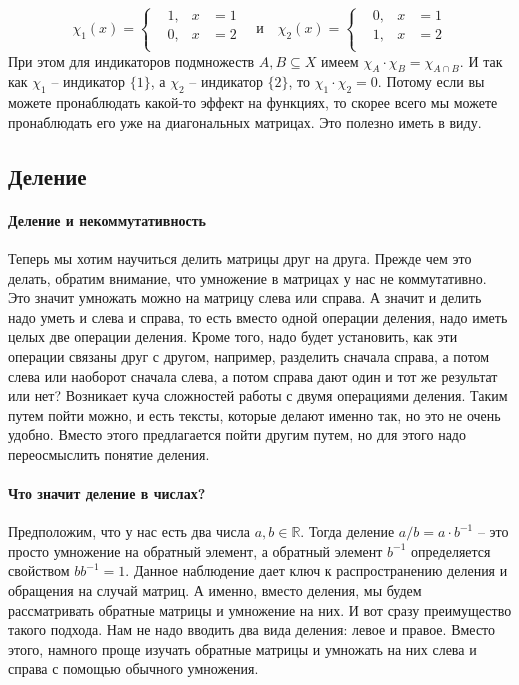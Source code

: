 \[
\chi_{1} (x) =
\left\{
\begin{aligned}
&1,& x &= 1\\
&0,& x &= 2\\
\end{aligned}
\right.
\quad\text{и}\quad
\chi_{2} (x) =
\left\{
\begin{aligned}
&0,& x &= 1\\
&1,& x &= 2\\
\end{aligned}
\right.
\]
При этом для индикаторов подмножеств $A, B\subseteq X$ имеем $\chi_A \cdot \chi_B = \chi_{A\cap B}$.
И так как $\chi_1$ -- индикатор $\{1\}$, а $\chi_2$ -- индикатор $\{2\}$, то $\chi_1 \cdot \chi_2 = 0$.
Потому если вы можете пронаблюдать какой-то эффект на функциях, то скорее всего мы можете пронаблюдать его уже на диагональных матрицах.
Это полезно иметь в виду.


\subsection{Деление}

\paragraph{Деление и некоммутативность}

Теперь мы хотим научиться делить матрицы друг на друга.
Прежде чем это делать, обратим внимание, что умножение в матрицах у нас не коммутативно.
Это значит умножать можно на матрицу слева или справа.
А значит и делить надо уметь и слева и справа, то есть вместо одной операции деления, надо иметь целых две операции деления.
Кроме того, надо будет установить, как эти операции связаны друг с другом, например, разделить сначала справа, а потом слева или наоборот сначала слева, а потом справа дают один и тот же результат или нет?
Возникает куча сложностей работы с двумя операциями деления.
Таким путем пойти можно, и есть тексты, которые делают именно так, но это не очень удобно.
Вместо этого предлагается пойти другим путем, но для этого надо переосмыслить понятие деления.

\paragraph{Что значит деление в числах?}

Предположим, что у нас есть два числа $a,b\in\mathbb R$.
Тогда деление $a/b = a \cdot b^{-1}$ -- это просто умножение на обратный элемент, а обратный элемент $b^{-1}$ определяется свойством $b b^{-1} = 1$.
Данное наблюдение дает ключ к распространению деления и обращения на случай матриц.
А именно, вместо деления, мы будем рассматривать обратные матрицы и умножение на них.
И вот сразу преимущество такого подхода.
Нам не надо вводить два вида деления: левое и правое.
Вместо этого, намного проще изучать обратные матрицы и умножать на них слева и справа с помощью обычного умножения.

